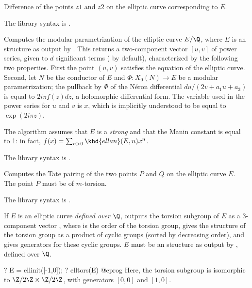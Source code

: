 \label{se:ellsub}
Difference of the points $z1$ and $z2$ on the
elliptic curve corresponding to $E$.

The library syntax is .

\label{se:elltaniyama}
Computes the modular parametrization of the elliptic curve $E/\Q$,
where $E$ is an  structure as output by . This returns
a two-component vector $[u,v]$ of power series, given to $d$ significant
terms ( by default), characterized by the following two
properties. First the point $(u,v)$ satisfies the equation of the elliptic
curve. Second, let $N$ be the conductor of $E$ and $\Phi: X_0(N)\to E$
be a modular parametrization; the pullback by $\Phi$ of the
N\'eron differential $du/(2v+a_1u+a_3)$ is equal to $2i\pi
f(z)dz$, a holomorphic differential form. The variable used in the power
series for $u$ and $v$ is $x$, which is implicitly understood to be equal to
$\exp(2i\pi z)$.

The algorithm assumes that $E$ is a \emph{strong} 
and that the Manin constant is equal to 1: in fact, $f(x) = \sum_{n > 0}
\kbd{ellan}(E, n) x^n$.

The library syntax is .

\label{se:elltatepairing}
Computes the Tate pairing of the two points $P$ and $Q$ on the elliptic
curve $E$. The point $P$ must be of $m$-torsion.

The library syntax is .

\label{se:elltors}
If $E$ is an elliptic curve \emph{defined over $\Q$}, outputs the torsion
subgroup of $E$ as a 3-component vector \kbd{[t,v1,v2]}, where  is the
order of the torsion group,  gives the structure of the torsion group
as a product of cyclic groups (sorted by decreasing order), and 
gives generators for these cyclic groups. $E$ must be an  structure
as output by , defined over $\Q$.

\bprog
?  E = ellinit([-1,0]);
?  elltors(E)
@eprog
Here, the torsion subgroup is isomorphic to $\Z/2\Z \times \Z/2\Z$, with
generators $[0,0]$ and $[1,0]$.

